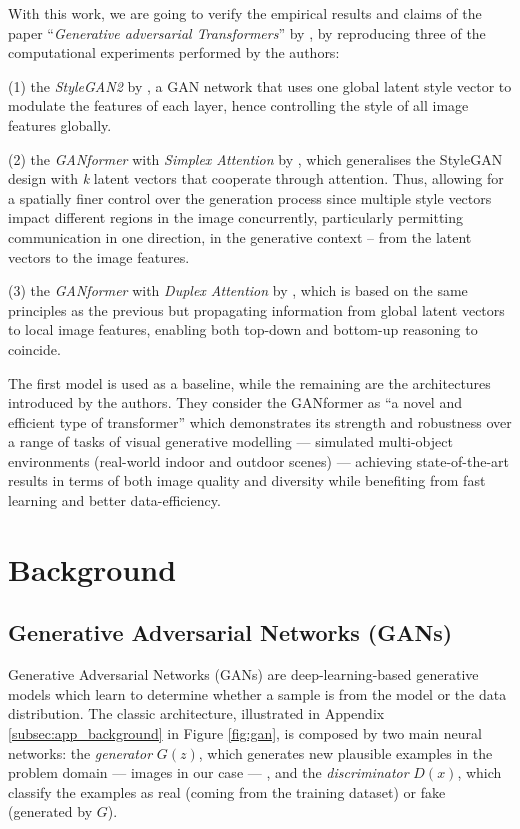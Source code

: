 \documentclass{article}
\begin{document}
With this work, we are going to verify the empirical results and claims of the paper 
``\emph{Generative adversarial Transformers}'' by \citet{hudson2021generative}, by reproducing 
three of the computational experiments performed by the authors:
\begin{enumerate*}
	\item[(1)] the \textit{StyleGAN2} by \citet{karras2020analyzing,karras2019style}, a GAN 
	network that uses one global latent style vector to modulate the features of each layer, hence 
	controlling the style of all image features globally.
	\item[(2)] the \textit{GANformer} with \textit{Simplex Attention} by 
	\citet{hudson2021generative}, which generalises the StyleGAN design with \textit{k} latent 
	vectors that cooperate through attention. Thus, allowing for a spatially finer control over the 
	generation 
	process since multiple style vectors impact different regions in the image concurrently, 
	particularly 
	permitting communication in one direction, in the generative context – from the latent vectors to 
	the 
	image features.
	\item[(3)] the \textit{GANformer} with \textit{Duplex Attention} by \citet{hudson2021generative}, 
	which is based on the same principles as the previous but propagating information from 
	global latent vectors to local image features, enabling both top-down and bottom-up reasoning to 
	coincide.
\end{enumerate*} 

The first model is used as a baseline, while the remaining are the architectures introduced by the 
authors. 
They consider the GANformer as “a novel and efficient type of transformer” which demonstrates its 
strength 
and robustness over a range of tasks of visual generative modelling — simulated multi-object 
environments 
(real-world indoor and outdoor scenes) — achieving state-of-the-art results in terms of both image 
quality 
and diversity while benefiting from fast learning and better data-efficiency.

\section{Background}\label{sec:background}
\subsection{Generative Adversarial Networks (GANs)}\label{sec:gan}
Generative Adversarial Networks (GANs) \cite{goodfellow2014generative} are deep-learning-based 
generative models which learn to determine whether a sample is from the model or the data 
distribution. 
The classic architecture, illustrated in Appendix \ref{subsec:app_background} in Figure 
\ref{fig:gan}, is 
composed by two main neural networks: 
the \textit{generator} ${G(z)}$, which generates new plausible examples in the problem domain — 
images in our case — , and the \textit{discriminator} ${D(x)}$, which classify the examples as 
real (coming from the training dataset) or fake (generated by $G$). 
\end{document}
